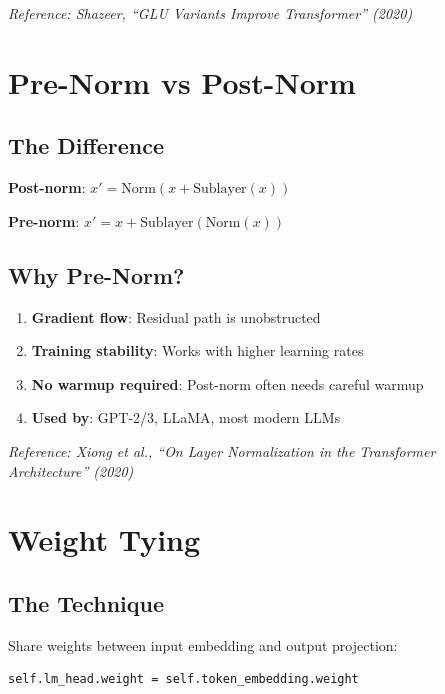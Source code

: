\textit{Reference: Shazeer, ``GLU Variants Improve Transformer'' (2020)}

\section{Pre-Norm vs Post-Norm}

\subsection{The Difference}

\textbf{Post-norm}: $x' = \text{Norm}(x + \text{Sublayer}(x))$

\textbf{Pre-norm}: $x' = x + \text{Sublayer}(\text{Norm}(x))$

\subsection{Why Pre-Norm?}

\begin{enumerate}
    \item \textbf{Gradient flow}: Residual path is unobstructed
    \item \textbf{Training stability}: Works with higher learning rates
    \item \textbf{No warmup required}: Post-norm often needs careful warmup
    \item \textbf{Used by}: GPT-2/3, LLaMA, most modern LLMs
\end{enumerate}

\textit{Reference: Xiong et al., ``On Layer Normalization in the Transformer Architecture'' (2020)}

\section{Weight Tying}

\subsection{The Technique}

Share weights between input embedding and output projection:
\begin{lstlisting}[style=python]
self.lm_head.weight = self.token_embedding.weight
\end{lstlisting}

